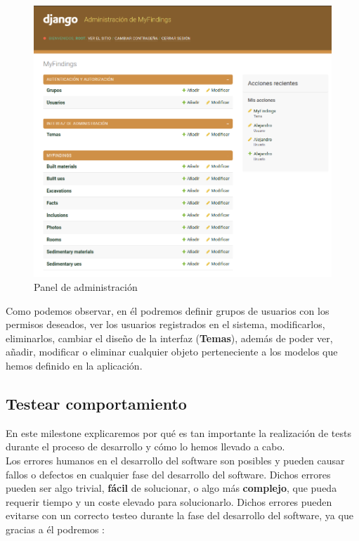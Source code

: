     \begin{figure}[H]
        \centering
        \includegraphics[scale=0.32]{imagenes/admin-interface.png}
        \caption{Panel de administración}
        \label{fig:admin-interface}
    \end{figure}

Como podemos observar, en él podremos definir grupos de usuarios con los permisos deseados,
ver los usuarios registrados en el sistema, modificarlos, eliminarlos, cambiar el diseño
de la interfaz (\textbf{Temas}), además de poder ver, añadir, modificar o eliminar
cualquier objeto perteneciente a los modelos que hemos definido en la aplicación.


\subsection{Testear comportamiento}
En este milestone explicaremos por qué es tan importante la realización de tests durante
el proceso de desarrollo y cómo lo hemos llevado a cabo.\\

Los errores humanos en el desarrollo del software son posibles y pueden causar fallos o
defectos en cualquier fase del desarrollo del software. Dichos errores pueden ser algo
trivial, \textbf{fácil} de solucionar, o algo más \textbf{complejo}, que pueda requerir
tiempo y un coste elevado para solucionarlo. Dichos errores pueden evitarse con un
correcto testeo durante la fase del desarrollo del software, ya que gracias a él
podremos \cite{why-testing}:

